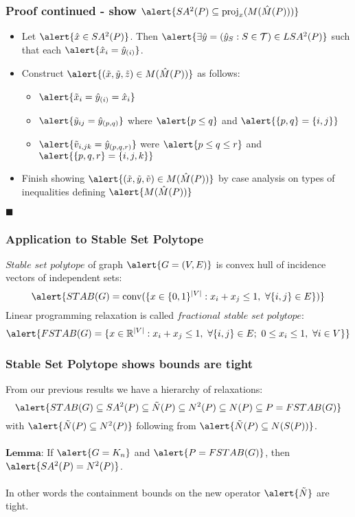 \documentclass{beamer}
\DeclareMathOperator{\conv}{conv}
\DeclareMathOperator{\proj}{proj}
\begin{document}
\begin{frame}
\frametitle{Proof continued - show $\alert{SA^2(P) \subseteq \proj_x(M(\hat{M}(P)))}$}
\begin{itemize}
\item Let $\alert{\hat{x} \in SA^2(P)}$. Then $\alert{\exists \hat{y} = (\hat{y}_S : S \in \mathcal{T}) \in LSA^2(P)}$ such that each $\alert{\hat{x}_i = \hat{y}_{(i)}}$.
\item Construct $\alert{(\tilde{x},\tilde{y},\tilde{z}) \in M(\hat{M}(P))}$ as follows:
\begin{itemize}
\item $\alert{\tilde{x}_i = \hat{y}_{(i)} = \hat{x}_i}$
\item $\alert{\tilde{y}_{ij} = \hat{y}_{(p,q)}}$ where $\alert{p \leq q}$ and $\alert{\{p,q\} = \{i,j\}}$
\item $\alert{\tilde{v}_{i,jk} = \hat{y}_{(p,q,r)}}$ were $\alert{p \leq q \leq r}$ and $\alert{\{p,q,r\} = \{i,j,k\}}$
\end{itemize}
\item Finish showing $\alert{(\tilde{x},\tilde{y}, \tilde{v}) \in M(\hat{M}(P))}$ by case analysis on types of inequalities defining $\alert{M(\hat{M}(P))}$
\end{itemize}
$\blacksquare$
\end{frame}

\begin{frame}
\frametitle{Application to Stable Set Polytope}
$\textit{Stable set polytope}$ of graph $\alert{G = (V,E)}$ is convex hull of incidence vectors of independent sets:
$$\alert{STAB(G) = \conv(\{x \in \{0,1\}^{|V|} : x_i + x_j \leq 1,\ \forall \{i,j\} \in E\})}$$
Linear programming relaxation is called $\textit{fractional stable set polytope}$:
$$\alert{FSTAB(G) = \{x \in \R^{|V|} : x_i + x_j \leq 1,\ \forall \{i,j\} \in E;\ 0 \leq x_i \leq 1,\ \forall i \in V\}}$$
\end{frame}

\begin{frame}
\frametitle{Stable Set Polytope shows bounds are tight}
From our previous results we have a hierarchy of relaxations:
$$\alert{STAB(G) \subseteq SA^2(P) \subseteq \tilde{N}(P) \subseteq N^2(P) \subseteq N(P) \subseteq P = FSTAB(G)}$$
with $\alert{\tilde{N}(P) \subseteq N^2(P)}$ following from $\alert{\tilde{N}(P) \subseteq N(S(P))}$.\\
\ \\
$\textbf{Lemma:}$ If $\alert{G = K_n}$ and $\alert{P = FSTAB(G)}$, then $\alert{SA^2(P) = N^2(P)}$.\\
\ \\
In other words the containment bounds on the new operator $\alert{\tilde{N}}$ are tight.
\end{frame}
\end{document}
